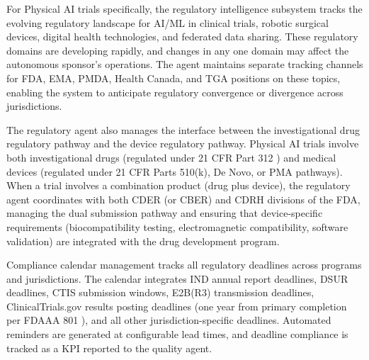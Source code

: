 For Physical AI trials specifically, the regulatory intelligence subsystem tracks the
evolving regulatory landscape for AI/ML in clinical trials, robotic surgical devices, digital
health technologies, and federated data sharing. These regulatory domains are developing
rapidly, and changes in any one domain may affect the autonomous sponsor's operations. The
agent maintains separate tracking channels for FDA, EMA, PMDA, Health Canada, and TGA
positions on these topics, enabling the system to anticipate regulatory convergence or
divergence across jurisdictions.

The regulatory agent also manages the interface between the investigational drug regulatory
pathway and the device regulatory pathway. Physical AI trials involve both investigational
drugs (regulated under 21 CFR Part 312 \cite{cfr-part-312}) and medical devices (regulated
under 21 CFR Parts 510(k), De Novo, or PMA pathways). When a trial involves a
combination product (drug plus device), the regulatory agent coordinates with both CDER
(or CBER) and CDRH divisions of the FDA, managing the dual submission pathway and ensuring
that device-specific requirements (biocompatibility testing, electromagnetic compatibility,
software validation) are integrated with the drug development program.

Compliance calendar management tracks all regulatory deadlines across programs and
jurisdictions. The calendar integrates IND annual report deadlines, DSUR deadlines, CTIS
submission windows, E2B(R3) transmission deadlines, ClinicalTrials.gov results posting
deadlines (one year from primary completion per FDAAA 801 \cite{fdaaa-801}), and all other
jurisdiction-specific deadlines. Automated reminders are generated at configurable lead
times, and deadline compliance is tracked as a KPI reported to the quality agent.
